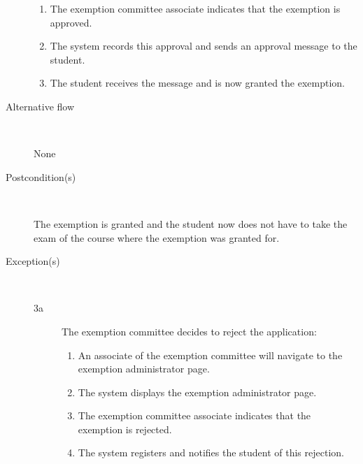 \begin{description}
\begin{enumerate}
	  	\item The exemption committee associate indicates that the exemption is
	  	approved.
	  	\item The system records this approval and sends an approval message to the
	  	student.
	  	\item The student receives the message and is now granted the exemption.
	\end{enumerate}
	\item[Alternative flow] \
		\par None
	\item[Postcondition(s)] \ 
		\par The exemption is granted and the student now does not have to take the
		exam of the course where the exemption was granted for. 
	\item[Exception(s)] \ 
	\begin{description}
		\item[3a] The exemption committee decides to reject the application:
		\begin{enumerate}
		  \item An associate of the exemption committee will navigate to the exemption administrator page.
		  \item The system displays the exemption administrator page.
		  \item The exemption committee associate indicates that the exemption is
		  rejected.
		  \item The system registers and notifies the student of this rejection.
		\end{enumerate}
	\end{description}
\end{description}